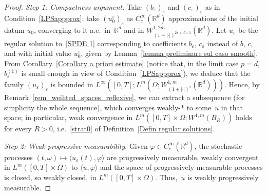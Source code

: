 \documentclass[a4paper,10pt]{article}
\newcommand\1{\mathbbm{1}}
\newcommand{\mr}{\mathbb{R}}
\newcommand{\eps}{\varepsilon}
\numberwithin{equation}{section}
\begin{document}
\begin{proof}
\emph{Step 1: Compactness argument.} Take $(b_\eps)_\eps$ and $(c_\eps)_\eps$ as in Condition~\ref{LPSappprox}; take $(u_0^\eps)_\eps$ as $C^\infty_c(\mr^d)$ approximations of the initial datum $u_0$, converging to it a.e.~in~$\mr^d$ and in $W_{(1+|\cdot|)^{2s+d+1}}^{1,2m}(\mr^d)$. Let $u_\eps$ be the regular solution to~\eqref{SPDE 1} corresponding to coefficients $b_\eps$, $c_\eps$ instead of $b$, $c$, and with initial value $u_0^\eps$, given by Lemma~\ref{lemma preliminare sul caso smooth}. From Corollary~\ref{Corollary a priori estimate} (notice that, in the limit case $p=d$, $b_\eps^{(1)}$ is small enough in view of Condition~\ref{LPSappprox}), we deduce that the family $(u_\eps)_\eps$ is bounded in $L^\infty([0,T];L^m(\Omega;W^{1,m}_{(1+|\cdot|)^{s}}(\mr^d)))$. Hence, by Remark~\ref{rem_weihted_spaces_reflexive}, we can extract a subsequence (for simplicity the whole sequence), which converges weakly-$*$ to some~$u$ in that space; in particular, weak convergence in $L^m([0,T]\times\Omega;W^{1,m}(B_R))$ holds for every $R>0$, i.e.~\ref{strat0} of Definition~\ref{Defin regular solutions}.

\emph{Step 2: Weak progressive measurability}. Given $\varphi\in C_{c}^{\infty}(\mathbb{R}^{d})$, the stochastic processes $(t,\omega) \mapsto \langle u_{\eps}(t),\varphi\rangle$ are progressively measurable, weakly convergent in $L^{m}([0,T]\times\Omega)$ to $\langle u,\varphi\rangle$ and the space of progressively measurable processes is closed, so weakly closed, in $L^{m}([0,T]\times\Omega)$. Thus,~$u$ is weakly progressively measurable.


\end{proof}
\end{document}
